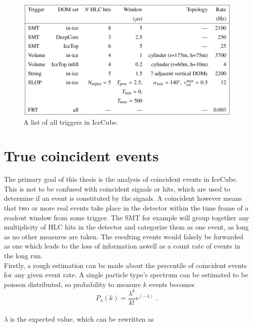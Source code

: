 \begin{figure}[htbp]
    \centering
    \includegraphics[width=\textwidth]{content/pictures/trigger_list.png}
    \caption{A list of all triggers in IceCube.}\label{fig:triggers}
\end{figure}

\section{True coincident events}\label{sec:coin}

The primary goal of this thesis is the analysis of coincident events in IceCube. This is not to be confused with coincident signals or hits, which are used 
to determine if an event is constituted by the signals. A coincident however means that two or more real events take place in the detector within the time 
frame of a readout window from some trigger. The SMT for example will group together any multiplicity of HLC hits in the detector and categorize them as one
event, as long as no other measures are taken. The resulting events would falsely be forwarded as one which leads to the loss of information aswell as 
a count rate of events in the long run. \\
Firstly, a rough estimation can be made about the percentile of coincident events for any given event rate. A single particle type's spectrum can be 
estimated to be poisson distributed, so probability to measure $k$ events becomes\\ 

\begin{equation}
    P_{\lambda}(k) = \frac{\lambda^k}{k!}\text{e}^(-\lambda) \; .
\end{equation}\\

$\lambda$ is the expected value, which can be rewritten as \\

